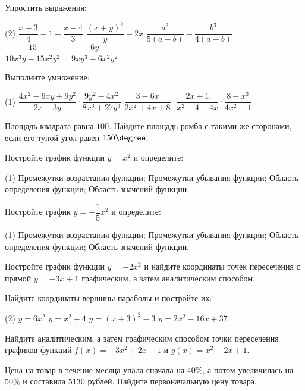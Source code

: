 \begin{homework}[number=1]
	\begin{listofex}
		\item Упростить выражения:
		\begin{tasks}(2)
			\task \( \dfrac{x-3}{4}-1-\dfrac{x-4}{3} \)
			\task \( \dfrac{(x+y)^2}{y}-2x \)
			\task \( \dfrac{a^2}{5(a-b)}-\dfrac{b^3}{4(a-b)} \)
			\task \( \dfrac{15}{10x^3y-15x^2y^2}-\dfrac{6y}{9xy^3-6x^2y^2} \)
		\end{tasks}
		\item Выполните умножение:
		\begin{tasks}(1)
			\task \( \dfrac{4x^2-6xy+9y^2}{2x-3y}\cdot\dfrac{9y^2-4x^2}{8x^3+27y^3} \)
			\task \( \dfrac{3-6x}{2x^2+4x+8}\cdot\dfrac{2x+1}{x^2+4-4x}\cdot\dfrac{8-x^3}{4x^2-1} \)
		\end{tasks}
		\item Площадь квадрата равна \( 100 \). Найдите площадь ромба с такими же сторонами, если его тупой угол равен \( 150\degree \).
	\end{listofex}
\end{homework}

\begin{class}[number=3]
	\begin{listofex}
		\item Постройте график функции \( y=x^2 \) и определите:
		\begin{tasks}(1)
			\task Промежутки возрастания функции;
			\task Промежутки убывания функции;
			\task Область определения функции;
			\task Область значений функции.
		\end{tasks}
		\item Постройте график \( y=-\dfrac{1}{5}x^2 \) и определите:
		\begin{tasks}(1)
			\task Промежутки возрастания функции;
			\task Промежутки убывания функции;
			\task Область определения функции;
			\task Область значений функции.
		\end{tasks}
		\item Постройте график функции \( y=-2x^2 \) и найдите координаты точек пересечения с прямой \( y=-3x+1 \) графическим, а затем аналитическим способом.
		\item Найдите координаты вершины параболы и постройте их:
		\begin{tasks}(2)
			\task \( y=6x^2 \)
			\task \( y=x^2+4 \)
			\task \( y=(x+3)^2-3 \)
			\task \( y=2x^2-16x+37 \)
		\end{tasks}
		\item Найдите аналитическим, а затем графическим способом точки пересечения графиков функций \(f(x)=-3x^2+2x+1\)	и \( g(x)=x^2-2x+1 \).
		\item Цена на товар в течение месяца упала сначала на \( 40\% \), а потом увеличилась на \( 50\% \) и составила \( 5130  \) рублей. Найдите первоначальную цену товара.
	\end{listofex}
\end{class}

